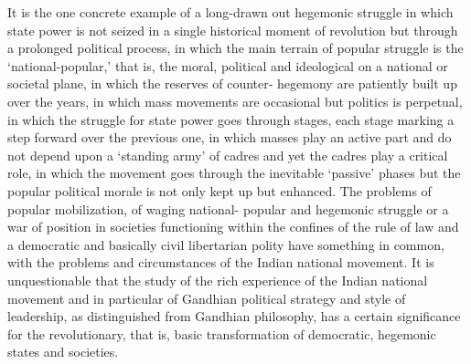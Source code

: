 It is the one concrete example of a long-drawn out hegemonic struggle in which state power is not seized in a single historical moment of revolution but through a prolonged political process, in which the main terrain of popular struggle is the `national-popular,' that is, the moral, political and ideological on a national or societal plane, in which the reserves of counter- hegemony are patiently built up over the years, in which mass movements are occasional but politics is perpetual, in which the struggle for state power goes through stages, each stage marking a step forward over the previous one, in which masses play an active part and do not depend upon a `standing army' of cadres and yet the cadres play a critical role, in which the movement goes through the inevitable `passive' phases but the popular political morale is not only kept up but enhanced. The problems of popular mobilization, of waging national- popular and hegemonic struggle or a war of position in societies functioning within the confines of the rule of law and a democratic and basically civil libertarian polity have something in common, with the problems and circumstances of the Indian national movement. It is unquestionable that the study of the rich experience of the Indian national movement and in particular of Gandhian political strategy and style of leadership, as distinguished from Gandhian philosophy, has a certain significance for the revolutionary, that is, basic transformation of democratic, hegemonic states and societies.

